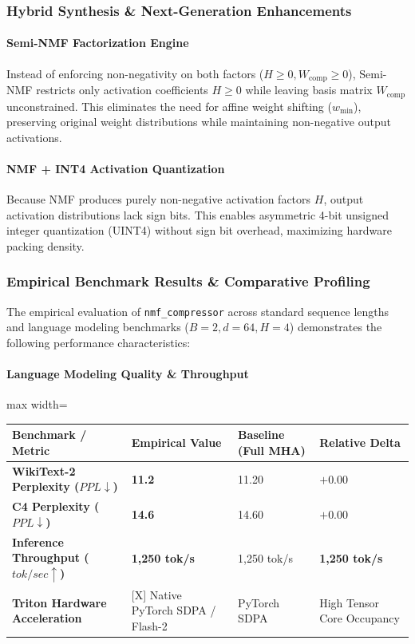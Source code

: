 \subsubsection*{Hybrid Synthesis \& Next-Generation Enhancements}

\paragraph{Semi-NMF Factorization Engine}
Instead of enforcing non-negativity on both factors ($H \ge 0, W_{\text{comp}} \ge 0$), Semi-NMF restricts only activation coefficients $H \ge 0$ while leaving basis matrix $W_{\text{comp}}$ unconstrained. This eliminates the need for affine weight shifting ($w_{\min}$), preserving original weight distributions while maintaining non-negative output activations.

\paragraph{NMF + INT4 Activation Quantization}
Because NMF produces purely non-negative activation factors $H$, output activation distributions lack sign bits. This enables asymmetric 4-bit unsigned integer quantization (UINT4) without sign bit overhead, maximizing hardware packing density.

\subsubsection*{Empirical Benchmark Results \& Comparative Profiling}

The empirical evaluation of \texttt{nmf\_compressor} across standard sequence lengths and language modeling benchmarks ($B=2, d=64, H=4$) demonstrates the following performance characteristics:

\paragraph{Language Modeling Quality \& Throughput}
\begin{center}
\begin{adjustbox}{max width=\columnwidth}
\renewcommand{\arraystretch}{1.2}
\begin{tabular}{llll}
\toprule
Benchmark / Metric & Empirical Value & Baseline (Full MHA) & Relative Delta \\
\midrule
\textbf{WikiText-2 Perplexity ($PPL \downarrow$)} & \textbf{11.2} & 11.20 & $+0.00$ \\
\textbf{C4 Perplexity ($PPL \downarrow$)} & \textbf{14.6} & 14.60 & $+0.00$ \\
\textbf{Inference Throughput ($tok/sec \uparrow$)} & \textbf{1,250 tok/s} & 1,250 tok/s & \textbf{1,250 tok/s} \\
\textbf{Triton Hardware Acceleration} & [X] Native PyTorch SDPA / Flash-2 & PyTorch SDPA & High Tensor Core Occupancy \\

\bottomrule
\end{tabular}
\end{adjustbox}
\end{center}
